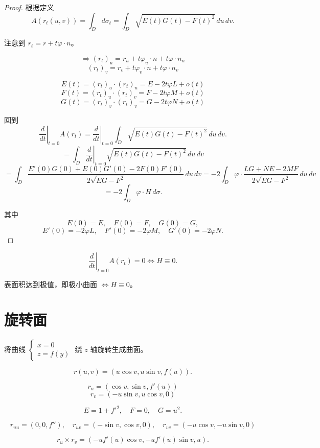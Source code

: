 \documentclass[lang=cn,10pt,thmcnt=section]{elegantbook}
\begin{document}
\begin{proof}
    根据定义
\[
A(r_t(u,v)) = \int_D d\sigma_t = \int_D \sqrt{E(t)G(t) - F(t)^2} \, du \, dv.
\]

注意到 $r_t = r + t \varphi \cdot n$。

\[
\Rightarrow (r_t)_u = r_u + t \varphi_u \cdot n + t \varphi \cdot n_u
\]
\[
(r_t)_v = r_v + t \varphi_v \cdot n + t \varphi \cdot n_v
\]

\[
E(t) = (r_t)_u \cdot (r_t)_u = E - 2t \varphi L + o(t)
\]
\[
F(t) = (r_t)_u \cdot (r_t)_v = F - 2t \varphi M + o(t)
\]
\[
G(t) = (r_t)_v \cdot (r_t)_v = G - 2t \varphi N + o(t)
\]


回到
\[
\left. \frac{d}{dt} \right|_{t=0} A(r_t) = \left. \frac{d}{dt} \right|_{t=0} \int_D \sqrt{E(t)G(t) - F(t)^2} \, du \, dv.
\]
\[
= \int_D \left. \frac{d}{dt} \right|_{t=0} \sqrt{E(t)G(t) - F(t)^2} \, du \, dv
\]
\[
= \int_D \frac{E'(0)G(0) + E(0)G'(0) - 2F(0)F'(0)}{2\sqrt{EG - F^2}} \, du \, dv = -2 \int_D \varphi \cdot \frac{LG + NE - 2MF}{2\sqrt{EG - F^2}} \, du \, dv
\]
\[
= -2 \int_D \varphi \cdot H \, d\sigma.
\]

其中
\[
E(0) = E, \quad F(0) = F, \quad G(0) = G,
\]
\[
E'(0) = -2\varphi L, \quad F'(0) = -2\varphi M, \quad G'(0) = -2\varphi N.
\]

\end{proof}
\begin{corollary}
    \[
\left. \frac{d}{dt} \right|_{t=0} A(r_t) = 0 \Longleftrightarrow H \equiv 0.
\]

表面积达到极值，即极小曲面 $\Longleftrightarrow H \equiv 0$。
\end{corollary}
\section{旋转面}

将曲线 $\begin{cases} x = 0 \\ z = f(y) \end{cases}$ 绕 $z$ 轴旋转生成曲面。

\[
r(u, v) = (u \cos v, u \sin v, f(u)).
\]

\[
r_u = (\cos v, \sin v, f'(u))
\]
\[
r_v = (-u \sin v, u \cos v, 0)
\]

\[
E = 1 + f'^2, \quad F = 0, \quad G = u^2.
\]

\[
r_{uu} = (0, 0, f''), \quad r_{uv} = (-\sin v, \cos v, 0), \quad r_{vv} = (-u \cos v, -u \sin v, 0)
\]

\[
r_{u} \times r_{v} = (-uf'(u)\cos v, -uf'(u)\sin v, u).
\]
\end{document}

